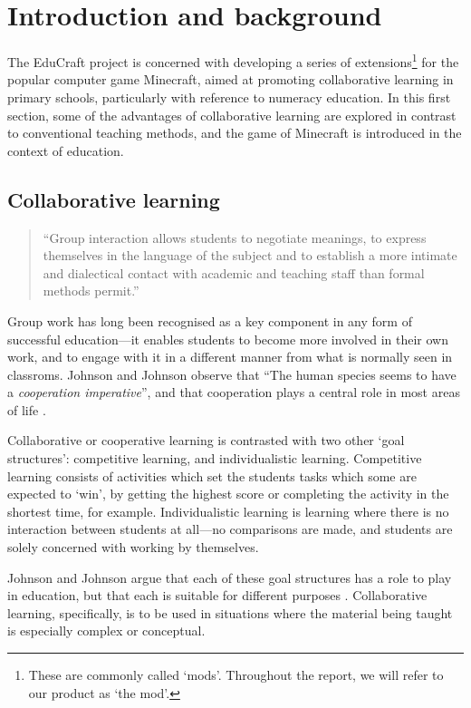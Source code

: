 \chapter{Introduction and background}
The EduCraft project is concerned with developing a series of
extensions\footnote{These are commonly called `mods'. Throughout the report, 
we will refer to our product as `the mod'.} for the popular computer game
Minecraft, aimed at promoting collaborative learning in primary schools,
particularly with reference to numeracy education. In this first section, some
of the advantages of collaborative learning are explored in contrast to
conventional teaching methods, and the game of Minecraft is introduced in the
context of education.

\section{Collaborative learning}
\begin{quote}
``Group interaction allows students to negotiate meanings, to express
themselves in the language of the subject and to establish a more intimate
and dialectical contact with academic and teaching staff than formal
methods permit.'' \cite[p.~1]{jacques00}
\end{quote}
Group work has long been recognised as a key component in any form of
successful education---it enables students to become more involved in their
own work, and to engage with it in a different manner from what is normally
seen in classroms. Johnson and Johnson observe that ``The human species seems
to have a \textit{cooperation imperative}'', and that cooperation plays
a central role in most areas of life \cite{johnson94}.

Collaborative or cooperative learning is contrasted with two other `goal
structures': competitive learning, and individualistic learning. Competitive
learning consists of activities which set the students tasks which some
are expected to `win', by getting the highest score or completing the activity
in the shortest time, for example. Individualistic learning is learning where
there is no interaction between students at all---no comparisons are made,
and students are solely concerned with working by themselves.

Johnson and Johnson argue that each of these goal structures has a role
to play in education, but that each is suitable for different
purposes \cite{johnson94}.  Collaborative learning, specifically, is to
be used in situations where the material being taught is especially
complex or conceptual.

